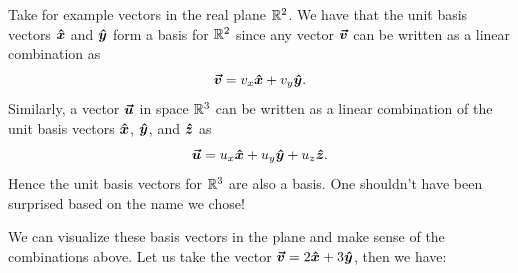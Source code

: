         Take for example vectors in the real plane $\mathbb{R}^2$.  We have that the unit basis vectors $\boldsymbol{\hat{x}}$ and $\boldsymbol{\hat{y}}$ form a basis for $\mathbb{R}^2$ since any vector $\boldsymbol{\boldsymbol{\vec{v}}}$ can be written as a linear combination as 
        \[
        \boldsymbol{\boldsymbol{\vec{v}}} = v_x \boldsymbol{\hat{x}} + v_y\boldsymbol{\hat{y}}.
        \]
        Similarly, a vector $\boldsymbol{\boldsymbol{\vec{u}}}$ in space $\mathbb{R}^3$ can be written as a linear combination of the unit basis vectors $\boldsymbol{\hat{x}}$, $\boldsymbol{\hat{y}}$, and $\boldsymbol{\hat{z}}$ as
        \[
        \boldsymbol{\boldsymbol{\vec{u}}} = u_x \boldsymbol{\hat{x}} + u_y \boldsymbol{\hat{y}} + u_z \boldsymbol{\hat{z}}.
        \]
        Hence the unit basis vectors for $\mathbb{R}^3$ are also a basis.  One shouldn't have been surprised based on the name we chose!
        
        We can visualize these basis vectors in the plane and make sense of the combinations above. Let us take the vector $\boldsymbol{\boldsymbol{\vec{v}}} = 2\boldsymbol{\hat{x}} + 3\boldsymbol{\hat{y}}$, then we have:
        \begin{center}
        \end{center}
        
